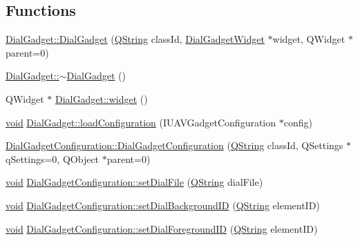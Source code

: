 \subsection*{\-Functions}
\begin{DoxyCompactItemize}
\item 
\hyperlink{group___dial_plugin_gaef5c9e1077a9a230622054bcc5337958}{\-Dial\-Gadget\-::\-Dial\-Gadget} (\hyperlink{group___u_a_v_objects_plugin_gab9d252f49c333c94a72f97ce3105a32d}{\-Q\-String} class\-Id, \hyperlink{class_dial_gadget_widget}{\-Dial\-Gadget\-Widget} $\ast$widget, \-Q\-Widget $\ast$parent=0)
\item 
\hyperlink{group___dial_plugin_ga9fc6ec1cdb4ac0de853c9b35950c4d11}{\-Dial\-Gadget\-::$\sim$\-Dial\-Gadget} ()
\item 
\-Q\-Widget $\ast$ \hyperlink{group___dial_plugin_ga1afd77bac7b60ceae978b7e74f9eddee}{\-Dial\-Gadget\-::widget} ()
\item 
\hyperlink{group___u_a_v_objects_plugin_ga444cf2ff3f0ecbe028adce838d373f5c}{void} \hyperlink{group___dial_plugin_ga571fd73249a763cfe4850be854e3dbc6}{\-Dial\-Gadget\-::load\-Configuration} (\-I\-U\-A\-V\-Gadget\-Configuration $\ast$config)
\item 
\hyperlink{group___dial_plugin_ga5818a8a26f5b9e63b9bc37f459ca6594}{\-Dial\-Gadget\-Configuration\-::\-Dial\-Gadget\-Configuration} (\hyperlink{group___u_a_v_objects_plugin_gab9d252f49c333c94a72f97ce3105a32d}{\-Q\-String} class\-Id, \-Q\-Settings $\ast$q\-Settings=0, \-Q\-Object $\ast$parent=0)
\item 
\hyperlink{group___u_a_v_objects_plugin_ga444cf2ff3f0ecbe028adce838d373f5c}{void} \hyperlink{group___dial_plugin_ga7172a5e20f324dd2e11a31167ee87a9a}{\-Dial\-Gadget\-Configuration\-::set\-Dial\-File} (\hyperlink{group___u_a_v_objects_plugin_gab9d252f49c333c94a72f97ce3105a32d}{\-Q\-String} dial\-File)
\item 
\hyperlink{group___u_a_v_objects_plugin_ga444cf2ff3f0ecbe028adce838d373f5c}{void} \hyperlink{group___dial_plugin_gaed251d96de4cea86a69a9b52529c5c69}{\-Dial\-Gadget\-Configuration\-::set\-Dial\-Background\-I\-D} (\hyperlink{group___u_a_v_objects_plugin_gab9d252f49c333c94a72f97ce3105a32d}{\-Q\-String} element\-I\-D)
\item 
\hyperlink{group___u_a_v_objects_plugin_ga444cf2ff3f0ecbe028adce838d373f5c}{void} \hyperlink{group___dial_plugin_gae2dfdc5ebf459904a68d37b1401bf723}{\-Dial\-Gadget\-Configuration\-::set\-Dial\-Foreground\-I\-D} (\hyperlink{group___u_a_v_objects_plugin_gab9d252f49c333c94a72f97ce3105a32d}{\-Q\-String} element\-I\-D)

\end{DoxyCompactItemize}
